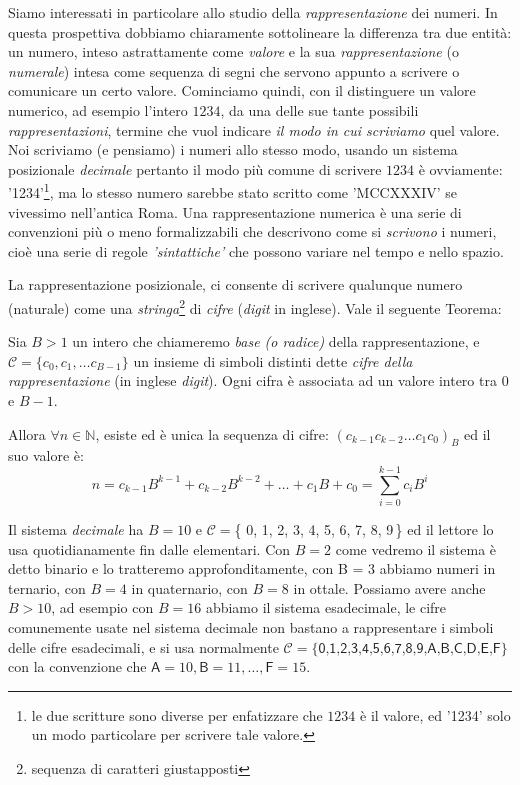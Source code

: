 Siamo interessati in particolare allo studio della \emph{rappresentazione} dei
numeri. In questa prospettiva dobbiamo chiaramente sottolineare la differenza
tra due entità: un numero, inteso astrattamente come \emph{valore} e la sua
\emph{rappresentazione} (o \emph{numerale}) intesa come sequenza di segni che
servono appunto a scrivere o comunicare un certo valore. Cominciamo quindi,
 con il distinguere un valore
numerico, ad esempio l'intero $1234$, da una delle sue tante possibili
\emph{rappresentazioni}, termine che vuol indicare \emph{il modo in cui
scriviamo} quel valore. Noi scriviamo (e pensiamo) i numeri allo stesso modo,
usando un sistema posizionale \emph{decimale} pertanto il modo più comune di
scrivere $1234$ è ovviamente: \textsf{'1234'}\footnote{le due scritture sono
diverse per enfatizzare che $1234$ è il valore, ed \textsf{'1234'} solo un modo
particolare per scrivere tale valore.}, ma lo stesso numero sarebbe stato
scritto come \textsf{'MCCXXXIV'} se vivessimo nell'antica Roma. Una
rappresentazione numerica è una serie di convenzioni più o meno formalizzabili
che descrivono come si \emph{scrivono} i numeri, cioè una serie di regole
\emph{'sintattiche'} che possono variare nel tempo e nello spazio.

La rappresentazione posizionale, ci consente di scrivere qualunque numero
(naturale) come una \emph{stringa}\footnote{sequenza di caratteri giustapposti}
di \emph{cifre} (\emph{digit} in inglese). Vale il seguente Teorema:




\begin{thm} Sia $B>1$ un
intero che chiameremo \emph{base (o radice)} della rap\-presentazione, e
$\mathcal{C} = \{ c_0, c_1, \ldots c_{B-1} \}$ un insieme di simboli distinti
dette \emph{cifre della rappresentazione} (in inglese \emph{digit}). Ogni cifra
è associata ad un valore intero tra $0$ e $B-1$.\bigskip

Allora $\forall n \in \mathbb{N}$, esiste ed è unica la sequenza di cifre:
$(c_{k-1}c_{k-2} \ldots c_1c_0)_B$ ed il suo valore è:
\begin{equation}\label{eq:pos} 
n = c_{k-1}B^{k-1}+c_{k-2}B^{k-2}+\ldots+c_1B+c_0 = \sum_{i=0}^{k-1} c_iB^i
\end{equation} \end{thm} %

Il sistema \emph{decimale} ha $B = 10$ e $\mathcal{C} = $\{\textsf{ 0, 1, 2, 3,
4, 5, 6, 7, 8, 9}\,\} ed il lettore lo usa quotidianamente fin dalle
elementari.  Con $B =
2$ come vedremo il sistema è detto binario e lo tratteremo approfonditamente,
con B = 3 abbiamo numeri in ternario, con $B = 4$ in quaternario, con $B = 8$
in ottale. Possiamo avere anche $B > 10$, ad esempio con $B = 16$ abbiamo il
sistema esadecimale, le cifre comunemente usate nel sistema decimale non
bastano a rappresentare i simboli delle cifre esadecimali, e si usa normalmente
$\mathcal{C} = \{ \textsf{0,1,2,3,4,5,6,7,8,9,A,B,C,D,E,F} \}$ con la
convenzione che $\textsf{A} = 10, \textsf{B} = 11, \ldots, \textsf{F} = 15$.

